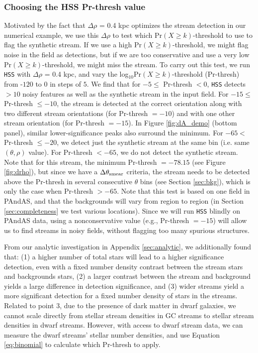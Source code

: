 \documentclass[twocolumn]{aastex631}
\begin{document}
\subsubsection{Choosing the HSS Pr-thresh value}\label{sec:prthresh}
Motivated by the fact that $\Delta \rho$ = 0.4 kpc optimizes the stream detection in our numerical example, we use this $\Delta \rho$ to test which Pr$(X \geq k)$-threshold to use to flag the synthetic stream. If we use a high Pr$(X \geq k)$-threshold, we might flag noise in the field as detections, but if we are too conservative and use a very low Pr$(X \geq k)$-threshold, we might miss the stream. To carry out this test, we run \texttt{HSS} with $\Delta \rho$ = 0.4 kpc, and vary the log$_{10}$Pr$(X \geq k)$-threshold (Pr-thresh) from -$120$ to $0$ in steps of $5$. We find that for $-5 \leq$ Pr-thresh $< 0$, \texttt{HSS} detects $>10$ noisy features as well as the synthetic stream in the input field. For $-15 \leq$ Pr-thresh $\leq -10$, the stream is detected at the correct orientation along with two different stream orientations (for Pr-thresh $=-10$) and with one other stream orientation (for Pr-thresh $= -15$). In Figure \ref{fig:dA_demo} (bottom panel), similar lower-significance peaks also surround the minimum. 
For $-65 <$ Pr-thresh $ \leq -20$, we detect just the synthetic stream at the same bin (i.e. same $(\theta,\rho)$ value). For  Pr-thresh $ < -65$, we do not detect the synthetic stream. Note that for this stream, the minimum Pr-thresh $=-78.15$ (see Figure \ref{fig:drho}), but since we have a $\Delta \theta_{\rm smear}$ criteria, the stream needs to be detected above the Pr-thresh in several consecutive $\theta$ bins (see Section \ref{sec:bkg}), which is only the case when Pr-thresh $ > -65$.
Note that this test is based on one field in PAndAS, and that the backgrounds will vary from region to region (in Section \ref{sec:completeness} we test various locations). Since we will run \texttt{HSS} blindly on PAndAS data, using a nonconservative value (e.g., Pr-thresh $= -15$) will allow us to find streams in noisy fields, without flagging too many spurious structures.

From our analytic investigation in Appendix \ref{sec:analytic}, we additionally found that: (1) a higher number of total stars will lead to a higher significance detection, even with a fixed number density contrast between the stream stars and backgrounds stars, (2) a larger contrast between the stream and background yields a large difference in detection significance, and (3) wider streams yield a more significant detection for a fixed number density of stars in the streams. Related to point 3, due to the presence of dark matter in dwarf galaxies, we cannot scale directly from stellar stream densities in GC streams to stellar stream densities in dwarf streams. However, with access to dwarf stream data, we can measure the dwarf streams' stellar number densities, and use Equation \ref{eq:binomial} to calculate which Pr-thresh to apply.
\end{document}
